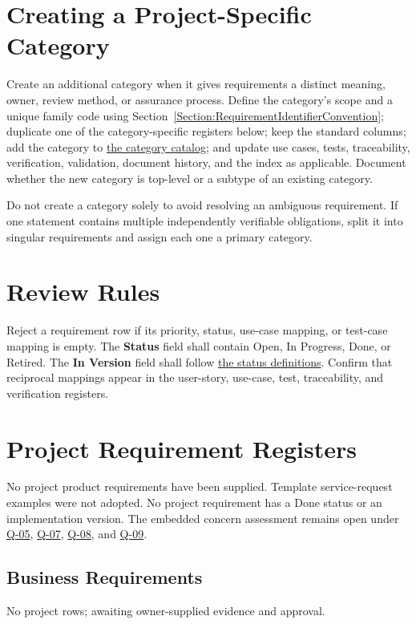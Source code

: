 \section{Creating a Project-Specific Category}
Create an additional category when it gives requirements a distinct meaning,
owner, review method, or assurance process. Define the category's scope and a
unique family code using
Section~\ref{Section:RequirementIdentifierConvention}; duplicate one of the
category-specific registers below; keep the standard columns; add the category to
\hyperref[Table:RequirementCategoryCatalog]{the category catalog}; and update
use cases, tests, traceability, verification, validation, document history, and
the index as applicable. Document whether the new category is top-level or a
subtype of an existing category.

Do not create a category solely to avoid resolving an ambiguous requirement.
If one statement contains multiple independently verifiable obligations, split
it into singular requirements and assign each one a primary category.

\section{Review Rules}
Reject a requirement row if its priority, status, use-case mapping, or test-case
mapping is empty. The \textbf{Status} field shall contain Open, In Progress,
Done, or Retired. The \textbf{In Version} field shall follow
\hyperref[Table:RequirementStatusDefinitions]{the status definitions}. Confirm
that reciprocal mappings appear in the user-story, use-case, test,
traceability, and verification registers.

\section{Project Requirement Registers}
No project product requirements have been supplied. Template service-request
examples were not adopted. No project requirement has a Done status or an
implementation version. The embedded concern assessment remains open under
\hyperref[Question:Q-05]{Q-05}, \hyperref[Question:Q-07]{Q-07},
\hyperref[Question:Q-08]{Q-08}, and \hyperref[Question:Q-09]{Q-09}.
\subsection{Business Requirements}
\label{Table:BusinessRequirements}
No project rows; awaiting owner-supplied evidence and approval.
